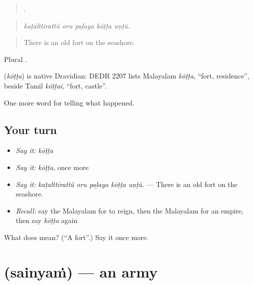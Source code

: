 \begin{quote}
    .
\end{quote}

\begin{quote}
\emph{kaṭalttīrattŭ oru paḻaya kōṭṭa uṇṭŭ.}
\end{quote}

\begin{quote}
There is an old fort on the seashore.
\end{quote}

Plural .

\begin{cousinweb}
\textbf{} (\emph{kōṭṭa}) is native Dravidian: DEDR 2207 lists Malayalam \emph{kōṭṭa}, \textquotedblleft{}fort, residence\textquotedblright{}, beside Tamil \emph{kōṭṭai}, \textquotedblleft{}fort, castle\textquotedblright{}.
\end{cousinweb}

\begin{grammarlens}[title={What you've built}]
One more word for telling what happened.
\end{grammarlens}

\subsection*{Your turn}
\begin{itemize}
\raggedright
  \item \emph{Say it:} \emph{kōṭṭa}
  \item \emph{Say it:} \emph{kōṭṭa}, once more
  \item \emph{Say it:} \emph{kaṭalttīrattŭ oru paḻaya kōṭṭa uṇṭŭ.} — There is an old fort on the seashore.
  \item \emph{Recall:} say the Malayalam for to reign, then the Malayalam for an empire, then say \emph{kōṭṭa} again
\end{itemize}

\begin{tcolorbox}[breakable,colback=teal!4,colframe=teal!35!black,title={Before you move on}]
What does  mean? (\textquotedblleft{}A fort\textquotedblright{}.) Say it once more.
\end{tcolorbox}
\section[\texorpdfstring{\ml{സൈന്യം} (sainyaṁ)}{സൈന്യം (sainyaṁ)}]{ (sainyaṁ) — an army}

